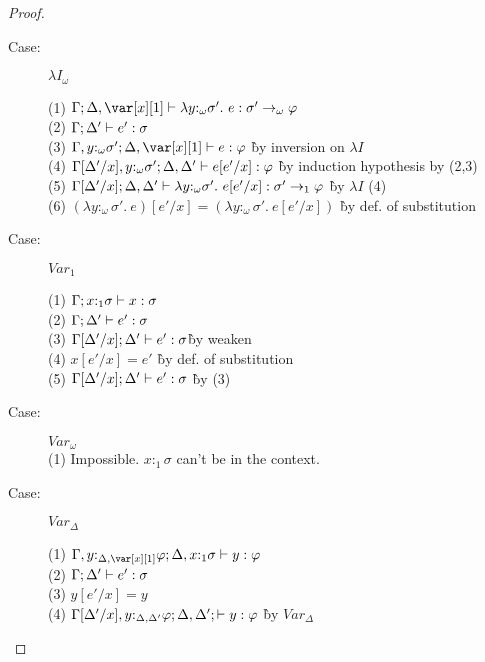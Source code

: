 \begin{proof}
\begin{description}
\item[Case:] $\lambda I_\omega$
\begin{tabbing}
  (1) $\G; \D, \xl \vdash \lambda y{:}_\omega\sigma'.~e : \sigma' \to_\omega \varphi$\\
  (2) $\Gamma; \Delta' \vdash e' : \sigma$\\
  (3) $\G, y{:}_\omega\sigma'; \D, \xl \vdash e : \varphi$ \` by inversion on $\lambda I$\\
  (4) $\Gamma[\Delta'/x], y{:}_\omega\sigma'; \Delta, \Delta' \vdash e[e'/x] : \varphi$ \` by induction hypothesis by (2,3)\\
  (5) $\Gamma[\Delta'/x]; \Delta,\Delta' \vdash \lambda y{:}_\omega\sigma'.~e[e'/x] : \sigma' \to_1 \varphi$ \` by $\lambda I$ (4)\\
  (6) $(\lambda y{:}_\omega\sigma'.~e)[e'/x] = (\lambda y{:}_\omega\sigma'.~e[e'/x])$ \` by def. of substitution\\
\end{tabbing}

\item[Case:] $Var_1$
\begin{tabbing}
  (1) $\Gamma;x{:}_1\sigma \vdash x : \sigma$\\
  (2) $\Gamma;\Delta' \vdash e' : \sigma$\\
  (3) $\Gamma[\Delta'/x]; \Delta' \vdash e' : \sigma$\` by weaken\\
  (4) $x[e'/x] = e'$ \` by def. of substitution\\
  (5) $\Gamma[\Delta'/x];\Delta' \vdash e' : \sigma$ \` by (3)\\
\end{tabbing}

\item[Case:] $Var_\omega$\\
  (1) Impossible. $x{:}_1\sigma$ can't be in the context.\\

\item[Case:] $Var_\Delta$
\begin{tabbing}
  (1) $\G,y{:}_{\Delta,\xl}\varphi; \D, x{:}_1\sigma \vdash y : \varphi$\\
  (2) $\Gamma; \Delta' \vdash e' : \sigma$\\
  (3) $y[e'/x] = y$\\
  (4) $\Gamma[\Delta'/x],y{:}_{\Delta,\Delta'}\varphi; \Delta,\Delta'; \vdash y : \varphi$ \` by $Var_\Delta$\\
\end{tabbing}


\end{description}
\end{proof}
